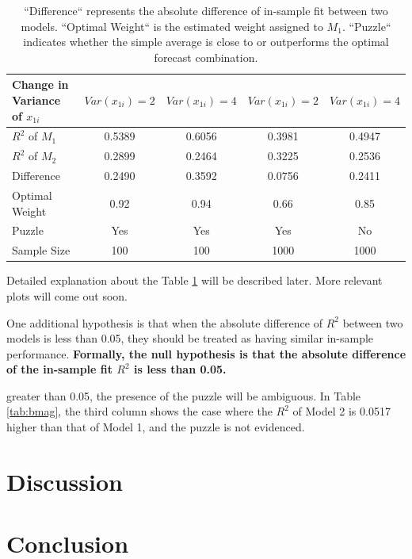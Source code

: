 \documentclass{monashthesis}
\begin{document}
\begin{table}[ht]
  \centering
    \begin{tabular}{l|cccc}
    \toprule
    Change in Variance of $x_{1i}$    &  $Var(x_{1i}) = 2$   &  $Var(x_{1i}) = 4$  &  $Var(x_{1i}) = 2$  &  $Var(x_{1i}) = 4$  \\
    \midrule
    $R^2$ of $M_1$  &    0.5389    &   0.6056   &    0.3981     &   0.4947   \\
    $R^2$ of $M_2$  &    0.2899    &   0.2464   &    0.3225     &   0.2536   \\
    Difference      &    0.2490    &   0.3592   &    0.0756     &   0.2411   \\
    Optimal Weight  &     0.92     &    0.94    &     0.66      &    0.85    \\
    Puzzle          &      Yes     &    Yes     &      Yes      &     No     \\
    Sample Size     &     100      &    100     &     1000      &    1000    \\
    \bottomrule
    \end{tabular}
  \caption{``Difference`` represents the absolute difference of in-sample fit between two models. ``Optimal Weight`` is the estimated weight assigned to $M_1$. ``Puzzle`` indicates whether the simple average is close to or outperforms the optimal forecast combination.}
  \label{tab:regvar}
\end{table}

Detailed explanation about the Table \ref{tab:regvar} will be described later. More relevant plots will come out soon.

One additional hypothesis is that when the absolute difference of \(R^2\) between two models is less than 0.05, they should be treated as having similar in-sample performance. \textbf{Formally, the null hypothesis is that the absolute difference of the in-sample fit \(R^2\) is less than 0.05.}

greater than 0.05, the presence of the puzzle will be ambiguous. In Table \ref{tab:bmag}, the third column shows the case where the \(R^2\) of Model 2 is 0.0517 higher than that of Model 1, and the puzzle is not evidenced.

\hypertarget{discussion}{%
\chapter{Discussion}\label{discussion}}

\hypertarget{conclusion}{%
\chapter{Conclusion}\label{conclusion}}
\end{document}
